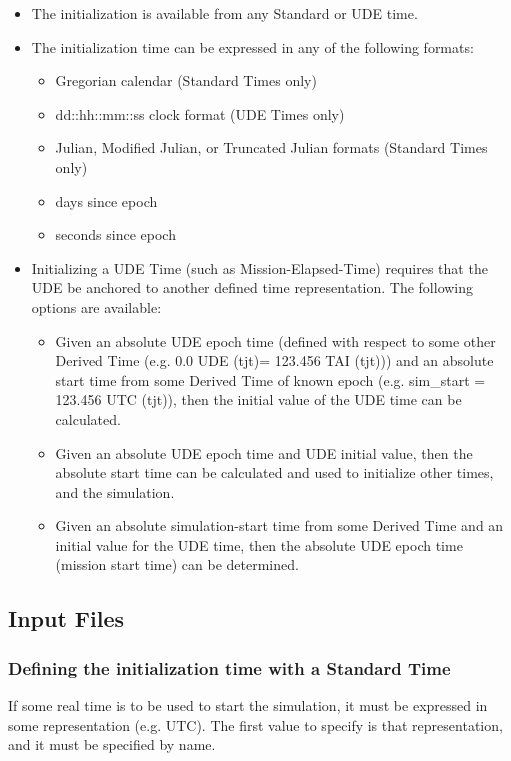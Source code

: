 \begin{itemize}
\item The initialization is available from any Standard or UDE time.
\item The initialization time can be expressed in any of the following
formats:

\begin{itemize}
\item Gregorian calendar (Standard Times only)
\item dd::hh::mm::ss clock format (UDE Times only)
\item Julian, Modified Julian, or Truncated Julian formats (Standard Times only)
\item days since epoch
\item seconds since epoch
\end{itemize}
\item Initializing a UDE Time (such as Mission-Elapsed-Time) requires
that the UDE be anchored to another defined time representation.  The
following options are available:

\begin{itemize}
\item Given an absolute UDE epoch time (defined with respect to some
other Derived Time (e.g. 0.0 UDE (tjt)= 123.456 TAI (tjt))) and an
absolute start time from some Derived Time of known epoch (e.g.
sim\_start = 123.456 UTC (tjt)), then the initial value of the UDE time
can be calculated.
\item Given an absolute UDE epoch time and UDE initial value, then the
absolute start time can be calculated and used to initialize other
times, and the simulation.
\item Given an absolute simulation-start time from some Derived Time and
an initial value for the UDE time, then the absolute UDE epoch time
(mission start time) can be determined.
\end{itemize}
\end{itemize}






\subsection{Input Files}
\subsubsection{Defining the initialization time with a Standard Time}
If some real time is to be used to start the simulation, it must be
expressed in some representation (e.g. UTC).  The first value to
specify is that representation, and it must be specified by name.


